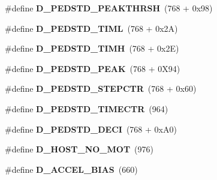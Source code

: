 \begin{DoxyCompactItemize}
\item 
\#define {\bfseries D\+\_\+\+P\+E\+D\+S\+T\+D\+\_\+\+P\+E\+A\+K\+T\+H\+R\+SH}~(768 + 0x98)\hypertarget{group___d_r_i_v_e_r_s_ga3b281a8de65d0ac3ed6321b4df4ab6d0}{}\label{group___d_r_i_v_e_r_s_ga3b281a8de65d0ac3ed6321b4df4ab6d0}

\item 
\#define {\bfseries D\+\_\+\+P\+E\+D\+S\+T\+D\+\_\+\+T\+I\+ML}~(768 + 0x2\+A)\hypertarget{group___d_r_i_v_e_r_s_ga1968b4f2f2daece7e19a24bad6388864}{}\label{group___d_r_i_v_e_r_s_ga1968b4f2f2daece7e19a24bad6388864}

\item 
\#define {\bfseries D\+\_\+\+P\+E\+D\+S\+T\+D\+\_\+\+T\+I\+MH}~(768 + 0x2\+E)\hypertarget{group___d_r_i_v_e_r_s_ga3c410f5ee95cf78486e71a276ed8b36a}{}\label{group___d_r_i_v_e_r_s_ga3c410f5ee95cf78486e71a276ed8b36a}

\item 
\#define {\bfseries D\+\_\+\+P\+E\+D\+S\+T\+D\+\_\+\+P\+E\+AK}~(768 + 0\+X94)\hypertarget{group___d_r_i_v_e_r_s_ga1e71c4f2fc11aa787bd4c8a5a4126525}{}\label{group___d_r_i_v_e_r_s_ga1e71c4f2fc11aa787bd4c8a5a4126525}

\item 
\#define {\bfseries D\+\_\+\+P\+E\+D\+S\+T\+D\+\_\+\+S\+T\+E\+P\+C\+TR}~(768 + 0x60)\hypertarget{group___d_r_i_v_e_r_s_ga4925c8f2bfe6e2698c10bf5b1094dc54}{}\label{group___d_r_i_v_e_r_s_ga4925c8f2bfe6e2698c10bf5b1094dc54}

\item 
\#define {\bfseries D\+\_\+\+P\+E\+D\+S\+T\+D\+\_\+\+T\+I\+M\+E\+C\+TR}~(964)\hypertarget{group___d_r_i_v_e_r_s_gaee461dfb8a3fcd18ea6dddeaba63457b}{}\label{group___d_r_i_v_e_r_s_gaee461dfb8a3fcd18ea6dddeaba63457b}

\item 
\#define {\bfseries D\+\_\+\+P\+E\+D\+S\+T\+D\+\_\+\+D\+E\+CI}~(768 + 0x\+A0)\hypertarget{group___d_r_i_v_e_r_s_gae84f6c1fd0f4ccc0f0b5aedc01d48636}{}\label{group___d_r_i_v_e_r_s_gae84f6c1fd0f4ccc0f0b5aedc01d48636}

\item 
\#define {\bfseries D\+\_\+\+H\+O\+S\+T\+\_\+\+N\+O\+\_\+\+M\+OT}~(976)\hypertarget{group___d_r_i_v_e_r_s_ga0ee24f50eee31a512b652647521d24bb}{}\label{group___d_r_i_v_e_r_s_ga0ee24f50eee31a512b652647521d24bb}

\item 
\#define {\bfseries D\+\_\+\+A\+C\+C\+E\+L\+\_\+\+B\+I\+AS}~(660)\hypertarget{group___d_r_i_v_e_r_s_ga2cc522b8f621f32418257ab61144a744}{}\label{group___d_r_i_v_e_r_s_ga2cc522b8f621f32418257ab61144a744}


\end{DoxyCompactItemize}
